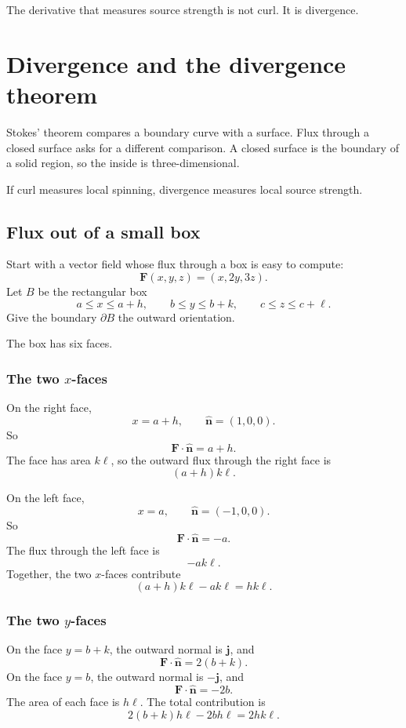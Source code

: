 The derivative that measures source strength is not curl.  It is divergence.

\section{Divergence and the divergence theorem}
\label{sec:15.6}

Stokes' theorem compares a boundary curve with a surface.  Flux through a closed
surface asks for a different comparison.  A closed surface is the boundary of a solid
region, so the inside is three-dimensional.

If curl measures local spinning, divergence measures local source strength.

\subsection{Flux out of a small box}

Start with a vector field whose flux through a box is easy to compute:
\[
    \mathbf F(x,y,z)=(x,2y,3z).
\]
Let \(B\) be the rectangular box
\[
    a\le x\le a+h,
    \qquad
    b\le y\le b+k,
    \qquad
    c\le z\le c+\ell.
\]
Give the boundary \(\partial B\) the outward orientation.

The box has six faces.

\subsubsection*{The two \(x\)-faces}

On the right face,
\[
    x=a+h,
    \qquad
    \widehat{\mathbf n}=(1,0,0).
\]
So
\[
    \mathbf F\cdot\widehat{\mathbf n}=a+h.
\]
The face has area \(k\ell\), so the outward flux through the right face is
\[
    (a+h)k\ell.
\]

On the left face,
\[
    x=a,
    \qquad
    \widehat{\mathbf n}=(-1,0,0).
\]
So
\[
    \mathbf F\cdot\widehat{\mathbf n}=-a.
\]
The flux through the left face is
\[
    -ak\ell.
\]
Together, the two \(x\)-faces contribute
\[
    (a+h)k\ell-ak\ell=hk\ell.
\]

\subsubsection*{The two \(y\)-faces}

On the face \(y=b+k\), the outward normal is \(\mathbf j\), and
\[
    \mathbf F\cdot\widehat{\mathbf n}=2(b+k).
\]
On the face \(y=b\), the outward normal is \(-\mathbf j\), and
\[
    \mathbf F\cdot\widehat{\mathbf n}=-2b.
\]
The area of each face is \(h\ell\).  The total contribution is
\[
    2(b+k)h\ell-2bh\ell=2hk\ell.
\]

